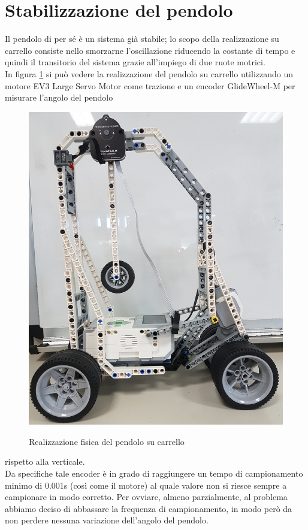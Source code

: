 \section{Stabilizzazione del pendolo}\label{stabPend}
Il pendolo di per sé è un sistema già stabile; lo scopo della realizzazione su carrello consiste nello smorzarne l'oscillazione riducendo la costante di tempo e quindi il transitorio del sistema grazie all'impiego di due ruote motrici.\\
In figura \ref{pendoloFisico} si può vedere la realizzazione del pendolo su carrello utilizzando un motore EV3 Large Servo Motor come trazione e un encoder GlideWheel-M per misurare l'angolo del pendolo 
\begin{figure}[ht]
	\centering
	\includegraphics[scale=0.08]{pendoloFisico.jpg}\\
	\caption{Realizzazione fisica del pendolo su carrello}
	\label{pendoloFisico}
\end{figure} 
rispetto alla verticale.\\
Da specifiche tale encoder è in grado di raggiungere un tempo di campionamento minimo di 0.001s (così come il motore) al quale valore non si riesce sempre a campionare in modo corretto. Per ovviare, almeno parzialmente, al problema abbiamo deciso di abbassare la frequenza di campionamento, in modo però da non perdere nessuna variazione dell'angolo del pendolo.\\
